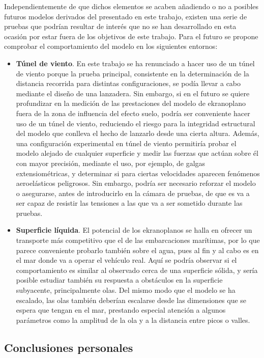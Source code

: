 Independientemente de que dichos elementos se acaben añadiendo o no a posibles futuros modelos derivados del presentado en este trabajo, existen una serie de pruebas que podrían resultar de interés que no se han desarrollado en esta ocasión por estar fuera de los objetivos de este trabajo. Para el futuro se propone comprobar el comportamiento del modelo en los siguientes entornos:
\begin{itemize}
\item \textbf{Túnel de viento}. En este trabajo se ha renunciado a hacer uso de un túnel de viento porque la prueba principal, consistente en la determinación de la distancia recorrida para distintas configuraciones, se podía llevar a cabo mediante el diseño de una lanzadera. Sin embargo, si en el futuro se quiere profundizar en la medición de las prestaciones del modelo de ekranoplano fuera de la zona de influencia del efecto suelo, podría ser conveniente hacer uso de un túnel de viento, reduciendo el riesgo para la integridad estructural del modelo que conlleva el hecho de lanzarlo desde una cierta altura. Además, una configuración experimental en túnel de viento permitiría probar el modelo alejado de cualquier superficie y medir las fuerzas que actúan sobre él con mayor precisión, mediante el uso, por ejemplo, de galgas extensiométricas, y determinar si para ciertas velocidades aparecen fenómenos aeroelásticos peligrosos. Sin embargo, podría ser necesario reforzar el modelo o asegurarse, antes de introducirlo en la cámara de pruebas, de que es va a ser capaz de resistir las tensiones a las que va a ser sometido durante las pruebas.
\item \textbf{Superficie líquida}. El potencial de los ekranoplanos se halla en ofrecer un transporte más competitivo que el de las embarcaciones marítimas, por lo que parece conveniente probarlo también sobre el agua, pues al fin y al cabo es en el mar donde va a operar el vehículo real. Aquí se podría observar si el comportamiento es similar al observado cerca de una superficie sólida, y sería posible estudiar también su respuesta a obstáculos en la superficie subyacente, principalmente olas. Del mismo modo que el modelo se ha escalado, las olas también deberían escalarse desde las dimensiones que se espera que tengan en el mar, prestando especial atención a algunos parámetros como la amplitud de la ola y a la distancia entre picos o valles.
\end{itemize}


\subsection{Conclusiones personales}
\label{sec:conclusions:personal}

